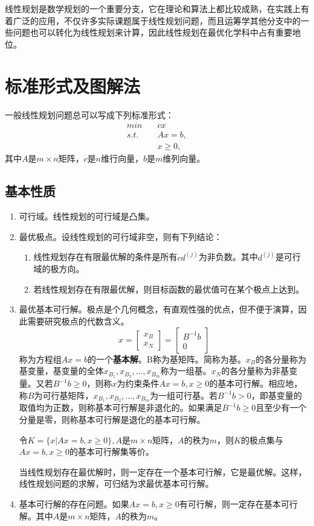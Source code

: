 线性规划是数学规划的一个重要分支，它在理论和算法上都比较成熟，在实践上有着广泛的应用，不仅许多实际课题属于线性规划问题，而且运筹学其他分支中的一些问题也可以转化为线性规划来计算，因此线性规划在最优化学科中占有重要地位。
\section{标准形式及图解法}
一般线性规划问题总可以写成下列标准形式：
\begin{equation}
	\begin{aligned}
		min &\quad cx \\
		s.t. &\quad Ax = b,\\
		&\quad  x \geq 0,
	\end{aligned}
\end{equation}
其中$A$是$m \times n$矩阵，$c$是$n$维行向量，$b$是$m$维列向量。
\subsection*{基本性质}
\begin{enumerate}
	\item 可行域。线性规划的可行域是凸集。
	\item 最优极点。设线性规划的可行域非空，则有下列结论：
	\begin{enumerate}
		\item 线性规划存在有限最优解的条件是所有$cd^{(j)}$为非负数。其中$d^{(j)}$是可行域的极方向。
		\item 若线性规划存在有限最优解，则目标函数的最优值可在某个极点上达到。
	\end{enumerate}
	\item 最优基本可行解。极点是个几何概念，有直观性强的优点，但不便于演算，因此需要研究极点的代数含义。
	\begin{equation}
		x = 
		\begin{bmatrix}
		x_B \\ x_N
		\end{bmatrix}
		=
		\begin{bmatrix}
		B^{-1}b \\ 0
		\end{bmatrix}
	\end{equation}
	称为方程组$Ax = b$的一个\textbf{基本解}。B称为基矩阵。简称为基。$x_B$的各分量称为基变量，基变量的全体$x_{B_1},x_{B_2},\dots ,x_{B_m}$称为一组基。$x_N$的各分量称为非基变量。又若$B^{-1} b \geq 0$，则称$x$为约束条件$Ax = b,x \geq 0$的基本可行解。相应地，称$B$为可行基矩阵，$x_{B_1},x_{B_2},\dots ,x_{B_m}$为一组可行基。若$B^{-1}b > 0$，即基变量的取值均为正数，则称基本可行解是非退化的。如果满足$B^{-1}b \geq 0$且至少有一个分量是零，则称基本可行解是退化的基本可行解。
	
	令$K = \{x|Ax = b,x\geq 0\},A$是$m\times n$矩阵，$A$的秩为$m$，则$K$的极点集与$Ax = b,x \geq 0$的基本可行解集等价。
	
	当线性规划存在最优解时，则一定存在一个基本可行解，它是最优解。这样，线性规划问题的求解，可归结为求最优基本可行解。
	\item 基本可行解的存在问题。如果$Ax = b ,x\geq 0$有可行解，则一定存在基本可行解。其中$A$是$m\times n$矩阵，$A$的秩为$m$。
\end{enumerate}
